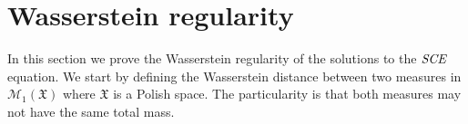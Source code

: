 \documentclass[11pt,a4paper]{article}
\newcommand{\RRP}{\mathbb{R}^+_*}
\newcommand{\MC}{\mathcal{M}}
\newcommand{\XF}{\mathfrak{X}}
\newcommand{\SCE}{\emph{SCE}}
\newcommand{\red}[1]{\textcolor{red}{#1}}
\newcommand{\brac}[1]{\left\langle#1\right\rangle}
\newcommand{\dd}{\mathop{}\!\mathrm{d}}
\newtheorem{corollary}[theorem]{Corollary}
\begin{document}

\section{Wasserstein regularity}
In this section we prove the Wasserstein regularity of the solutions to the $\SCE$ equation. We start by defining the Wasserstein distance between two measures in $\MC_1(\XF)$ where $\XF$ is a Polish space. The particularity is that both measures may not have the same total mass. 
\end{document}
